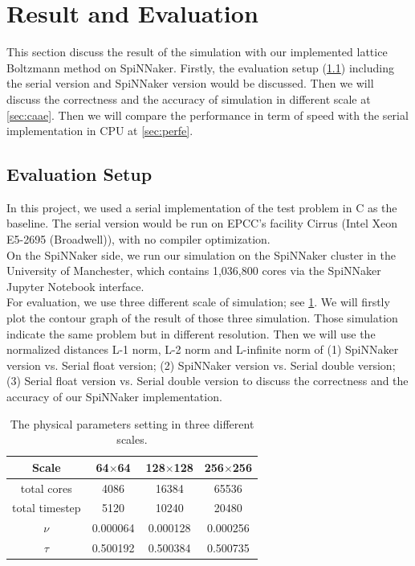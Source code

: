 \section{Result and Evaluation} \label{sec:eval}
This section discuss the result of the simulation with our implemented lattice Boltzmann method on SpiNNaker. Firstly, the evaluation setup (\ref{sec:es}) including the serial version and SpiNNaker version would be discussed. Then we will discuss the correctness and the accuracy of simulation in different scale at \ref{sec:caae}. Then we will compare the performance in term of speed with the serial implementation in CPU at \ref{sec:perfe}.
\subsection{Evaluation Setup} \label{sec:es}
In this project, we used a serial implementation of the test problem in C as the baseline. The serial version would be run on EPCC's facility Cirrus (Intel Xeon E5-2695 (Broadwell)), with no compiler optimization.\\

On the SpiNNaker side, we run our simulation on the SpiNNaker cluster in the University of Manchester, which contains 1,036,800 cores via the SpiNNaker Jupyter Notebook interface. \\

For evaluation, we use three different scale of simulation; see \ref{table:setting}. We will firstly plot the contour graph of the result of those three simulation. Those simulation indicate the same problem but in different resolution. Then we will use the normalized distances L-1 norm, L-2 norm and L-infinite norm  of (1) SpiNNaker version vs. Serial float version; (2) SpiNNaker version vs. Serial double version; (3) Serial float version vs. Serial double version to discuss the correctness and the accuracy of our SpiNNaker implementation.\\

\begin{table}[tb]
\centering
\begin{tabular}{|c|c|c|c|}
\hline
Scale          & 64$\times$64 & 128$\times$128 & 256$\times$256 \\ \hline
total cores    & 4086         & 16384          & 65536          \\ \hline
total timestep  & 5120         & 10240          & 20480          \\ \hline
$\nu$           & 0.000064     & 0.000128       & 0.000256       \\ \hline
$\tau$           & 0.500192     & 0.500384       & 0.500735       \\ \hline
\end{tabular}
\caption{The physical parameters setting in three different scales.}
\label{table:setting}
\end{table}


